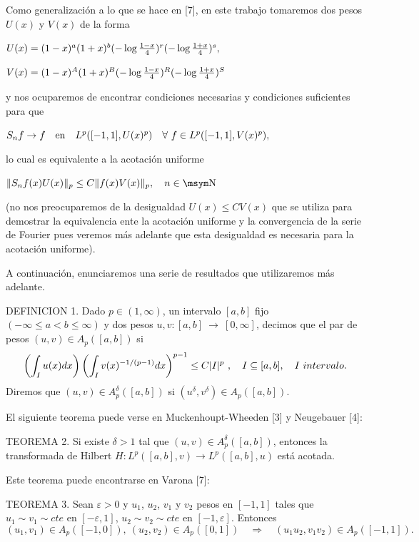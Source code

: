 Como generalizaci\'on a lo que se hace en [7], en este trabajo tomaremos dos
pesos $U(x)$ y $V(x)$ de la forma

\centerline{$ U(x)=(1-x)^a(1+x)^b(-\log{1-x\over 4})^r(-\log{1+x \over 4})^s,$}

\vskip 5pt

\centerline{$V(x)=(1-x)^A(1+x)^B(-\log{1-x \over 4})^R(-\log{1+x \over 4})^S$}

\vskip 5pt
\noindent y nos ocuparemos de encontrar condiciones necesarias y condiciones
suficientes para que

\vskip 5pt
\centerline{$S_nf\rightarrow f \quad {\rm en} \quad L^p([-1,1],U(x)^p) \quad
\forall\ f\in L^p([-1,1],V(x)^p),$}

\vskip 5pt
\noindent lo cual es equivalente a la acotaci\'on uniforme

\vskip 5pt
\centerline{$\Vert S_nf(x) U(x)\Vert_{p}\le C\Vert
f(x) V(x)\Vert_{p},\quad n\in \N$}

\vskip 5pt
\noindent (no nos preocuparemos de la desigualdad $U(x) \le C V(x)$ que se
utiliza para demostrar la equivalencia ente la acotaci\'on uniforme y la
convergencia de la serie de Fourier pues veremos m\'as adelante que esta
desigualdad es necesaria para la acotaci\'on uniforme).

A continuaci\'on, enunciaremos una serie de resultados que utilizaremos m\'as
adelante.

\proclaim DEFINICION 1.  Dado $p\in(1,\infty)$, un  intervalo $[a,b]$ fijo
$(-\infty\le a<b\le\infty)$ y dos pesos $u,v: [a,b]\ \rightarrow \ [0,\infty]$,
decimos que el par de pesos $(u,v)\in A_p([a,b])$ si
$$\left(\int_Iu(x)dx\right)\left(\int_Iv(x)^{-1/(p-1)}dx\right)^{p-1}\le C|I|^p\
,\quad I\subseteq [a,b], \quad I{\sl\ intervalo}.$$
Diremos que $(u,v)\in A_p^{\delta}([a,b])$ si $(u^{\delta},v^{\delta})\in
A_p([a,b]).$
\vskip 10pt


El siguiente teorema puede verse en Muckenhoupt-Wheeden [3] y Neugebauer
[4]:

\proclaim TEOREMA 2. Si existe $\delta>1$ tal que $(u,v)\in
A_p^{\delta}([a,b])$, entonces la transformada de Hilbert  $H:L^p([a,b],v)
\rightarrow L^p([a,b],u)$ est\'a acotada.
\vskip 10pt

Este teorema puede encontrarse en Varona [7]:

\proclaim TEOREMA 3. Sean $\varepsilon >0$ y $u_1$, $u_2$, $v_1$ y $v_2$ pesos
en $[-1,1]$ tales que $u_1\sim v_1\sim cte$ en $[-\varepsilon,1]$, $u_2\sim
v_2\sim cte$ en $[-1,\varepsilon]$. Entonces
$$(u_1,v_1)\in A_p([-1,0]),\ (u_2,v_2)\in A_p([0
,1])\quad\Rightarrow \quad (u_1u_2,v_1v_2)\in A_p([-1,1]).$$



